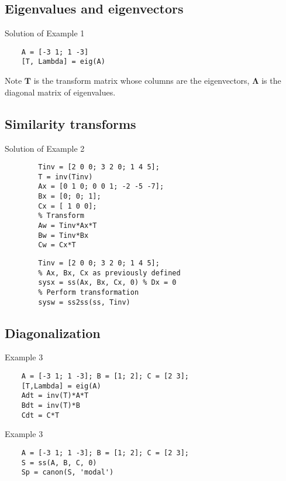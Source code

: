 \subsection*{Eigenvalues and eigenvectors}

\begin{slide}
   Solution of Example 1
   \begin{verbatim}
	A = [-3 1; 1 -3]
	[T, Lambda] = eig(A)
   \end{verbatim}
	Note $\mathbf{T}$ is the transform matrix whose columns are the eigenvectors, $\mathbf{\Lambda}$ is the diagonal matrix of eigenvalues.
\end{slide}

\subsection*{Similarity transforms}

\begin{slide}
	Solution of Example 2
	\begin{verbatim}
		Tinv = [2 0 0; 3 2 0; 1 4 5];
		T = inv(Tinv)
		Ax = [0 1 0; 0 0 1; -2 -5 -7];
		Bx = [0; 0; 1];
		Cx = [ 1 0 0];
		% Transform
		Aw = Tinv*Ax*T
		Bw = Tinv*Bx
		Cw = Cx*T
	\end{verbatim}
\end{slide}

\begin{slide}
	\begin{verbatim}
		Tinv = [2 0 0; 3 2 0; 1 4 5];
		% Ax, Bx, Cx as previously defined
		sysx = ss(Ax, Bx, Cx, 0) % Dx = 0
		% Perform transformation
		sysw = ss2ss(ss, Tinv)
	\end{verbatim}
\end{slide}


\subsection{Diagonalization}

\begin{slide}
Example 3
\begin{verbatim}
	A = [-3 1; 1 -3]; B = [1; 2]; C = [2 3];
	[T,Lambda] = eig(A)
	Adt = inv(T)*A*T
	Bdt = inv(T)*B
	Cdt = C*T
\end{verbatim}
\end{slide}

\begin{slide}
Example 3
\begin{verbatim}
	A = [-3 1; 1 -3]; B = [1; 2]; C = [2 3];
	S = ss(A, B, C, 0)
	Sp = canon(S, 'modal')
\end{verbatim}
\end{slide}



\endinput

